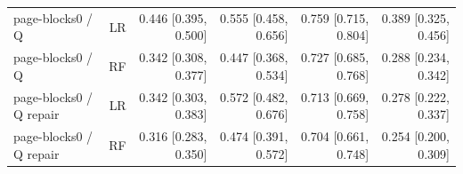 \begin{table}[!t]
\begin{tabular}{lrrrrr}
page-blocks0 / Q & LR & 0.446 [0.395, 0.500] & 0.555 [0.458, 0.656] & 0.759 [0.715, 0.804] & 0.389 [0.325, 0.456] \\
page-blocks0 / Q & RF & 0.342 [0.308, 0.377] & 0.447 [0.368, 0.534] & 0.727 [0.685, 0.768] & 0.288 [0.234, 0.342] \\
page-blocks0 / Q repair & LR & 0.342 [0.303, 0.383] & 0.572 [0.482, 0.676] & 0.713 [0.669, 0.758] & 0.278 [0.222, 0.337] \\
page-blocks0 / Q repair & RF & 0.316 [0.283, 0.350] & 0.474 [0.391, 0.572] & 0.704 [0.661, 0.748] & 0.254 [0.200, 0.309] \\
\bottomrule
\end{tabular}
\end{table}
